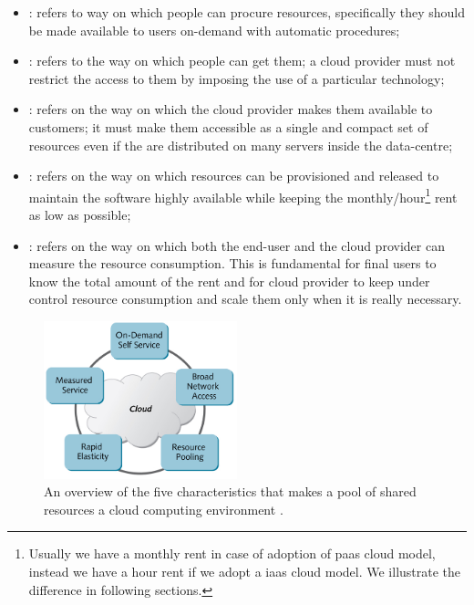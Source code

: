 \begin{itemize}
	\item{: refers to way on which people can procure resources, specifically
		they should be made available to users on-demand with automatic procedures;}
	\item{: refers to the way on which people can get them; a cloud provider
		must not restrict the access to them by imposing the use of a particular technology;}
	\item{: refers on the way on which the cloud provider makes them available to
		customers; it must make them accessible as a single and compact set of resources even if the are
		distributed on many servers inside the data-centre;}
	\item{: refers on the way on which resources can be provisioned and released
		to maintain the software highly available while keeping the monthly/hour\footnote{Usually we have a
		monthly rent in case of adoption of \acs{paas} cloud model, instead we have a hour rent if we adopt
		a \acs{iaas} cloud model. We illustrate the difference in following sections.} rent as low as possible;}
	\item{: refers on the way on which both the end-user and the cloud provider
		can measure the resource consumption. This is fundamental for final users to know the total amount of
		the rent and for cloud provider to keep under control resource consumption and scale them only when
		it is really necessary.}
\end{itemize}

\begin{figure}
	\centering{}
	\includegraphics[width=0.5\textwidth]{chapters/background/images/cloud-characteristics.png}
	\caption[Key characteristics of cloud computing]{An overview of the five characteristics that makes a
		pool of shared resources a cloud computing environment \cite{cloudCharacteristics}.}
	\label{img:background-cloudComputing-characteristics}
\end{figure}

